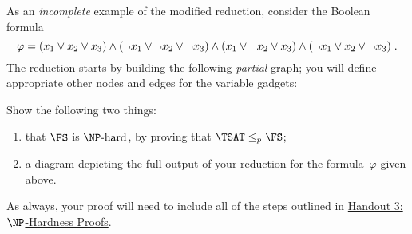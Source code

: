 \documentclass[11pt,addpoints]{exam}
\newcommand{\NPhard}{\NP\text{-hard}}
\begin{document}
\begin{questions}
  As an \emph{incomplete} example of the modified reduction, consider the Boolean formula \[ \varphi = (x_1 \lor x_2 \lor x_3) \land (\neg x_1 \lor \neg x_2 \lor \neg x_3) \land (x_1 \lor \neg x_2 \lor x_3) \land (\neg x_1 \lor x_2 \lor \neg x_3) \; \text.
  \] The reduction starts by building the following \emph{partial} graph; you will define appropriate other nodes and edges for the variable gadgets:
    
  \begin{center}
  \end{center}
  
  Show the following two things:
  \begin{enumerate}
  \item that $\FS$ is $\NPhard$, by proving that $\TSAT \leq_p \FS$;
  \item a diagram depicting the full output of your reduction for the formula~$\varphi$ given above.
  \end{enumerate}

  As always, your proof will need to include all of the steps outlined in \href{https://drive.google.com/drive/u/1/folders/1fHV5RQgjvt0rWCTYv2EExI0M3cVDyi6G}{Handout 3: $\NP$-Hardness Proofs}.


\end{questions}
\end{document}
